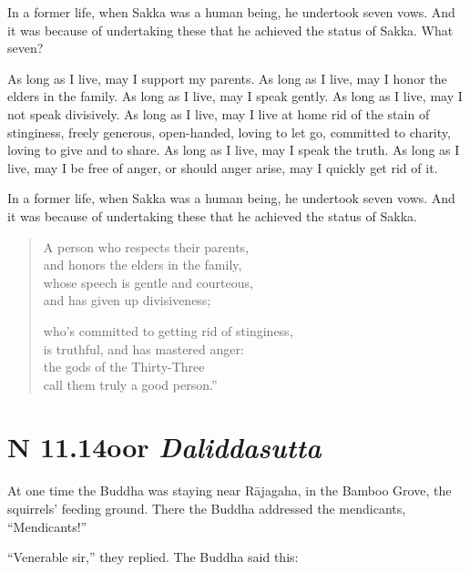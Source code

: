 \documentclass[12pt,openany]{book}%
\newcommand*{\suttatitleacronym}[1]{\smaller[2]{#1}\vspace*{.3em}}
\newcommand*{\suttatitletranslation}[1]{\linebreak{#1}}
\newcommand*{\suttatitleroot}[1]{\linebreak\smaller[2]\itshape{#1}}
\newcommand*{\tocacronym}[1]{\hspace*{-3.3em}{#1}\quad}
\newcommand*{\toctranslation}[1]{#1}
\newcommand*{\tocroot}[1]{(\textit{#1})}
\begin{document}
In a former life, when Sakka was a human being, he undertook seven vows. And it was because of undertaking these that he achieved the status of Sakka. What seven? 

As long as I live, may I support my parents. As long as I live, may I honor the elders in the family. As long as I live, may I speak gently. As long as I live, may I not speak divisively. As long as I live, may I live at home rid of the stain of stinginess, freely generous, open-handed, loving to let go, committed to charity, loving to give and to share. As long as I live, may I speak the truth. As long as I live, may I be free of anger, or should anger arise, may I quickly get rid of it. 

In a former life, when Sakka was a human being, he undertook seven vows. And it was because of undertaking these that he achieved the status of Sakka. 

\begin{verse}%
A person who respects their parents, \\
and honors the elders in the family, \\
whose speech is gentle and courteous, \\
and has given up divisiveness; 

who’s committed to getting rid of stinginess, \\
is truthful, and has mastered anger: \\
the gods of the Thirty-Three \\
call them truly a good person.” 

%
\end{verse}

%
\section*{{\suttatitleacronym SN 11.14}{\suttatitletranslation Poor }{\suttatitleroot Daliddasutta}}
\addcontentsline{toc}{section}{\tocacronym{SN 11.14} \toctranslation{Poor } \tocroot{Daliddasutta}}

At one time the Buddha was staying near \textsanskrit{Rājagaha}, in the Bamboo Grove, the squirrels’ feeding ground. There the Buddha addressed the mendicants, “Mendicants!” 

“Venerable sir,” they replied. The Buddha said this: 
\end{document}
